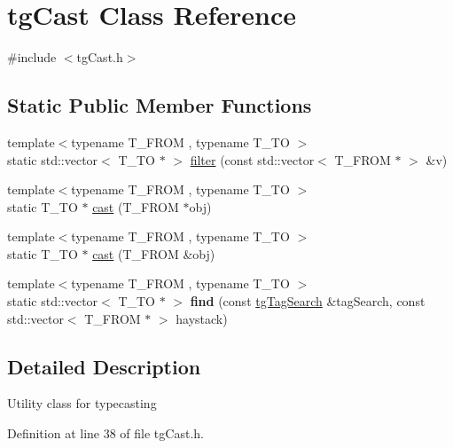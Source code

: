 \hypertarget{classtg_cast}{\section{tg\-Cast Class Reference}
\label{classtg_cast}
}


{\ttfamily \#include $<$tg\-Cast.\-h$>$}

\subsection*{Static Public Member Functions}
\begin{DoxyCompactItemize}
\item 
{\footnotesize template$<$typename T\-\_\-\-F\-R\-O\-M , typename T\-\_\-\-T\-O $>$ }\\static std\-::vector$<$ T\-\_\-\-T\-O $\ast$ $>$ \hyperlink{classtg_cast_a8af34972fd56916c145154544fb9c81d}{filter} (const std\-::vector$<$ T\-\_\-\-F\-R\-O\-M $\ast$ $>$ \&v)
\item 
{\footnotesize template$<$typename T\-\_\-\-F\-R\-O\-M , typename T\-\_\-\-T\-O $>$ }\\static T\-\_\-\-T\-O $\ast$ \hyperlink{classtg_cast_a25141576cb5aa5de8323b096b1da4fe4}{cast} (T\-\_\-\-F\-R\-O\-M $\ast$obj)
\item 
{\footnotesize template$<$typename T\-\_\-\-F\-R\-O\-M , typename T\-\_\-\-T\-O $>$ }\\static T\-\_\-\-T\-O $\ast$ \hyperlink{classtg_cast_a7eb068181f54113dcdce17c2cd3ab308}{cast} (T\-\_\-\-F\-R\-O\-M \&obj)
\item 
\hypertarget{classtg_cast_ae76307bab5c1a812915b62352de3a9f2}{{\footnotesize template$<$typename T\-\_\-\-F\-R\-O\-M , typename T\-\_\-\-T\-O $>$ }\\static std\-::vector$<$ T\-\_\-\-T\-O $\ast$ $>$ {\bfseries find} (const \hyperlink{classtg_tag_search}{tg\-Tag\-Search} \&tag\-Search, const std\-::vector$<$ T\-\_\-\-F\-R\-O\-M $\ast$ $>$ haystack)}\label{classtg_cast_ae76307bab5c1a812915b62352de3a9f2}

\end{DoxyCompactItemize}


\subsection{Detailed Description}
Utility class for typecasting 

Definition at line 38 of file tg\-Cast.\-h.



